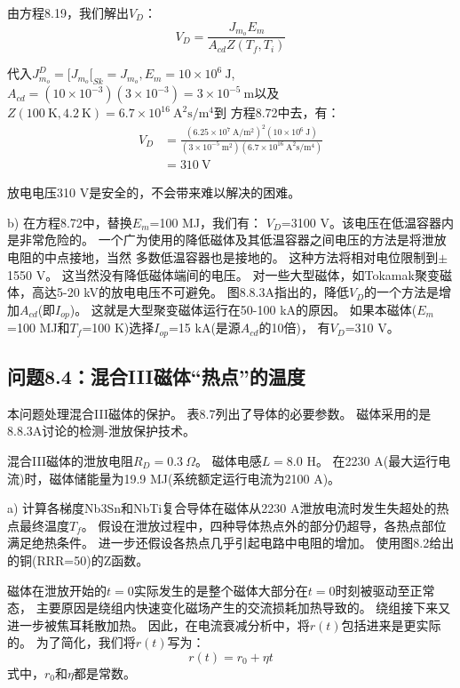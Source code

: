 由方程8.19，我们解出$V_D$：
\begin{equation}%
V_D=\frac{J_{m_o}E_m}{A_{cd}Z(T_f,T_i)}
\end{equation}

代入$J_{m_o}^D=[J_{m_o}[_{Sk}=J_{m_o}, E_m=10\times 10^6\ \mathrm{J}$,
$A_{cd}=(10\times 10^{-3})(3\times 10^{-3})=3\times 10^{-5}\ \mathrm{m}$以及
$Z(100\ \mathrm{K},4.2\ \mathrm{K})=6.7\times 10^{16}\ \mathrm{A^2 s/m^4}$到
方程8.72中去，有：
\begin{align*}%
V_D&=\frac{(6.25\times 10^7\ \mathrm{A/m^2})^2(10\times 10^6\ \mathrm{J})}{(3\times 10^{-5}\ \mathrm{m^2})(6.7\times 10^{16}\ \mathrm{A^2s/m^4})} \\\tag{S3.1}
&=310\ \mathrm{V} 
\end{align*}

放电电压310 V是安全的，不会带来难以解决的困难。

b) 在方程8.72中，替换$E_m$=100 MJ，我们有：
$V_D$=3100 V。该电压在低温容器内是非常危险的。
一个广为使用的降低磁体及其低温容器之间电压的方法是将泄放电阻的中点接地，当然
多数低温容器也是接地的。
这种方法将相对电位限制到$\pm$1550 V。
这当然没有降低磁体端间的电压。
对一些大型磁体，如Tokamak聚变磁体，高达5-20 kV的放电电压不可避免。
图8.8.3A指出的，降低$V_D$的一个方法是增加$A_{cd}$(即$I_{op}$)。
这就是大型聚变磁体运行在50-100 kA的原因。
如果本磁体($E_m$=100 MJ和$T_f$=100 K)选择$I_{op}$=15 kA(是源$A_{cd}$的10倍)，
有$V_D$=310 V。


\subsection{问题8.4：混合III磁体“热点”的温度}
本问题处理混合III磁体的保护。
表8.7列出了导体的必要参数。
磁体采用的是8.8.3A讨论的检测-泄放保护技术。

混合III磁体的泄放电阻$R_D=0.3\ \Omega$。
磁体电感$L=8.0$ H。
在2230 A(最大运行电流)时，磁体储能量为19.9 MJ(系统额定运行电流为2100 A)。

a) 计算各梯度Nb3Sn和NbTi复合导体在磁体从2230 A泄放电流时发生失超处的热点最终温度$T_f$。
假设在泄放过程中，四种导体热点外的部分仍超导，各热点部位满足绝热条件。
进一步还假设各热点几乎引起电路中电阻的增加。
使用图8.2给出的铜(RRR=50)的Z函数。

磁体在泄放开始的$t=0$实际发生的是整个磁体大部分在$t=0$时刻被驱动至正常态，
主要原因是绕组内快速变化磁场产生的交流损耗加热导致的。
绕组接下来又进一步被焦耳耗散加热。
因此，在电流衰减分析中，将$r(t)$包括进来是更实际的。
为了简化，我们将$r(t)$写为：
\begin{equation}%
r(t)=r_0+\eta t
\end{equation}
式中，$r_0$和$\eta$都是常数。

